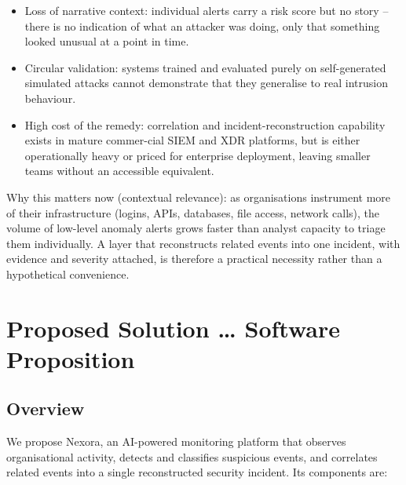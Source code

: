 \documentclass[12pt]{article}
\begin{document}
\begin{itemize}
  \item Loss of narrative context: individual alerts carry a risk score but no story -- there is no indication of what an attacker was doing, only that something looked unusual at a point in time.
  \item Circular validation: systems trained and evaluated purely on self-generated simulated attacks cannot demonstrate that they generalise to real intrusion behaviour.
  \item High cost of the remedy: correlation and incident-reconstruction capability exists in mature commer-cial SIEM and XDR platforms, but is either operationally heavy or priced for enterprise deployment, leaving smaller teams without an accessible equivalent.
\end{itemize}

Why this matters now (contextual relevance): as organisations instrument more of their infrastructure (logins, APIs, databases, file access, network calls), the volume of low-level anomaly alerts grows faster than analyst capacity to triage them individually. A layer that reconstructs related events into one incident, with evidence and severity attached, is therefore a practical necessity rather than a hypothetical convenience.

\section{Proposed Solution \ldots{} Software Proposition}

\subsection{Overview}

We propose Nexora, an AI-powered monitoring platform that observes organisational activity, detects and classifies suspicious events, and correlates related events into a single reconstructed security incident. Its components are:
\end{document}
